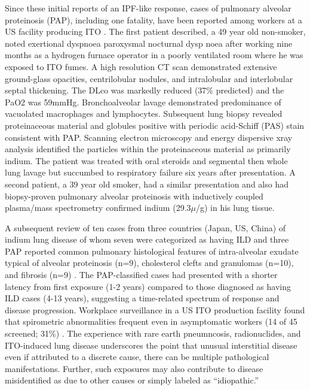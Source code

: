 \documentclass[a4paper,12pt]{article}
\begin{document}
Since these initial reports of an IPF-like response, cases of pulmonary alveolar proteinosis (PAP), including one fatality, have been reported among workers at a US facility producing ITO \cite{Cummings2010}. The first patient described, a 49 year old non-smoker, noted exertional dyspnoea paroxysmal nocturnal dysp noea after working nine months as a hydrogen furnace operator in a poorly ventilated room where he was exposed to ITO fumes. A high resolution CT scan demonstrated extensive ground-glass opacities, centrilobular nodules, and intralobular and interlobular septal thickening. The DLco was markedly reduced (37\% predicted) and the PaO2 was 59mmHg. Bronchoalveolar lavage demonstrated predominance of vacuolated macrophages and lymphocytes. Subsequent lung biopsy revealed proteinaceous material and globules positive with periodic acid-Schiff (PAS) stain consistent with PAP. Scanning electron microscopy and energy dispersive xray analysis identified the particles within the proteinaceous material as primarily indium. The patient was treated with oral steroids and segmental then whole lung lavage but succumbed to respiratory failure six years after presentation. A second patient, a 39 year old smoker, had a similar presentation and also had biopsy-proven pulmonary alveolar proteinosis with inductively coupled plasma/mass spectrometry confirmed indium (29.3\ensuremath{\mu}/g) in his lung tissue. 

A subsequent review of ten cases from three countries (Japan, US, China) of indium lung disease of whom seven were categorized as having ILD and three PAP reported common pulmonary histological features of intra-alveolar exudate typical of alveolar proteinosis (n=9), cholesterol clefts and granulomas (n=10), and fibrosis (n=9) \cite{Cummings2012}. The PAP-classified cases had presented with a shorter latency from first exposure (1-2 years) compared to those diagnosed as having ILD cases (4-13 years), suggesting a time-related spectrum of response and disease progression. Workplace surveillance in a US ITO production facility found that spirometric abnormalities frequent even in asymptomatic workers (14 of 45 screened; 31\%) \cite{Cummings2013}. 
The experience with rare earth pneumncosis, radionuclides, and ITO-induced lung disease underscores the point that unusual interstitial disease even if attributed to a discrete cause, there can be multiple pathological manifestations. Further, such exposures may also contribute to disease misidentified as due to other causes or simply labeled as “idiopathic.”    
\end{document}
